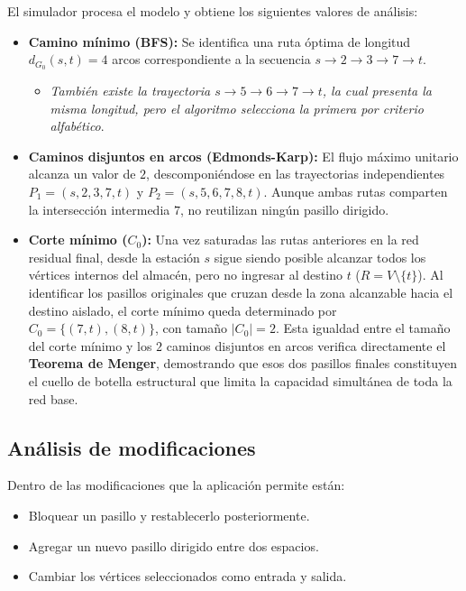 \documentclass[12pt,a4paper]{article}
\providecommand{\tightlist}{\setlength{\itemsep}{0pt}\setlength{\parskip}{0pt}}
\begin{document}
El simulador procesa el modelo y obtiene los siguientes valores de análisis:

\begin{itemize}
\item
  \textbf{Camino mínimo (BFS):} Se identifica una ruta óptima de longitud \(d_{G_0}(s, t) = 4\) arcos correspondiente a la secuencia \(s \to 2 \to 3 \to 7 \to t\).

  \begin{itemize}
  \tightlist
  \item
    \emph{También existe la trayectoria \(s \to 5 \to 6 \to 7 \to t\), la cual presenta la misma longitud, pero el algoritmo selecciona la primera por criterio alfabético}.
  \end{itemize}
\item
  \textbf{Caminos disjuntos en arcos (Edmonds-Karp):} El flujo máximo unitario alcanza un valor de \(2\), descomponiéndose en las trayectorias independientes \(P_1 = (s, 2, 3, 7, t)\) y \(P_2 = (s, 5, 6, 7, 8, t)\). Aunque ambas rutas comparten la intersección intermedia \(7\), no reutilizan ningún pasillo dirigido.
\item
  \textbf{Corte mínimo (\(C_0\)):} Una vez saturadas las rutas anteriores en la red residual final, desde la estación \(s\) sigue siendo posible alcanzar todos los vértices internos del almacén, pero no ingresar al destino \(t\) (\(R = V \setminus \{t\}\)). Al identificar los pasillos originales que cruzan desde la zona alcanzable hacia el destino aislado, el corte mínimo queda determinado por \(C_0 = \{(7, t), (8, t)\}\), con tamaño \(\vert{}C_0\vert{} = 2\). Esta igualdad entre el tamaño del corte mínimo y los \(2\) caminos disjuntos en arcos verifica directamente el \textbf{Teorema de Menger}, demostrando que esos dos pasillos finales constituyen el cuello de botella estructural que limita la capacidad simultánea de toda la red base.
\end{itemize}

\subsection{Análisis de modificaciones}\label{anuxe1lisis-de-modificaciones}

Dentro de las modificaciones que la aplicación permite están:

\begin{itemize}
\tightlist
\item
  Bloquear un pasillo y restablecerlo posteriormente.
\item
  Agregar un nuevo pasillo dirigido entre dos espacios.
\item
  Cambiar los vértices seleccionados como entrada y salida.
\end{itemize}
\end{document}
